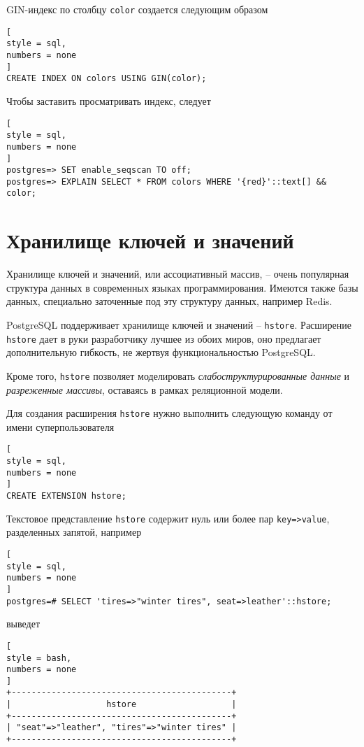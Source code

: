 \documentclass[%
	11pt,
	a4paper,
	utf8,
		]{article}
\begin{document}
GIN-индекс по столбцу \texttt{color} создается следующим образом
\begin{lstlisting}[
style = sql,
numbers = none
]
CREATE INDEX ON colors USING GIN(color);
\end{lstlisting}

Чтобы заставить просматривать индекс, следует
\begin{lstlisting}[
style = sql,
numbers = none
]
postgres=> SET enable_seqscan TO off;
postgres=> EXPLAIN SELECT * FROM colors WHERE '{red}'::text[] && color;
\end{lstlisting}

\section{Хранилище ключей и значений}

Хранилище ключей и значений, или ассоциативный массив, -- очень популярная структура данных в современных языках программирования. Имеются также базы данных, специально заточенные под эту структуру данных, например Redis.

PostgreSQL поддерживает хранилище ключей и значений -- \texttt{hstore}. Расширение \texttt{hstore} дает в руки разработчику лучшее из обоих миров, оно предлагает дополнительную гибкость, не жертвуя функциональностью PostgreSQL.

Кроме того, \texttt{hstore} позволяет моделировать \emph{слабоструктурированные данные} и \emph{разреженные массивы}, оставаясь в рамках реляционной модели.

Для создания расширения \texttt{hstore} нужно выполнить следующую команду от имени суперпользователя
\begin{lstlisting}[
style = sql,
numbers = none
]
CREATE EXTENSION hstore;
\end{lstlisting}

Текстовое представление \texttt{hstore} содержит нуль или более пар \texttt{key=>value}, разделенных запятой, например
\begin{lstlisting}[
style = sql,
numbers = none
]
postgres=# SELECT 'tires=>"winter tires", seat=>leather'::hstore;
\end{lstlisting}
выведет
\begin{lstlisting}[
style = bash,
numbers = none
]
+--------------------------------------------+
|                   hstore                   |
+--------------------------------------------+
| "seat"=>"leather", "tires"=>"winter tires" |
+--------------------------------------------+
\end{lstlisting}
\end{document}
